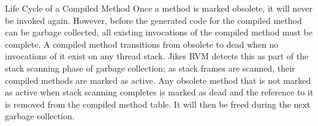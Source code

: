 \begin{section}{Life Cycle of a Compiled Method}
Once a method is marked obsolete, it will never be invoked again.  However, before the generated code for the compiled method can be garbage collected, all existing invocations of the compiled method must be complete.  A compiled method transitions from obsolete to  dead when no invocations of it exist on any thread stack.  Jikes RVM detects this as part of the stack scanning phase of garbage collection; as stack frames are scanned, their compiled methods are marked as active.  Any obsolete method that is not marked as active when stack scanning completes is marked as dead and the reference to it is removed from the compiled method table.  It will then be freed during the next garbage collection.

\end{section}
